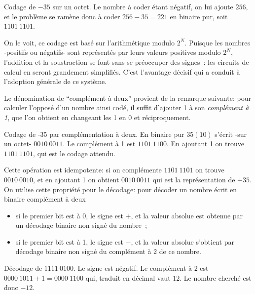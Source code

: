 \begin{exemple}{Codage de $-35$ sur un octet.} Le nombre \`a coder \'etant n\'egatif,
on lui ajoute $256$, et le probl\`eme se ram\`ene donc \`a coder 
$256-35 = 221$ en binaire pur, soit $1101\ 1101$.
\end{exemple}

On le voit, ce codage est bas\'e sur l'arithm\'etique modulo $2^N$. Puisque
les nombres -positifs ou n\'egatifs- sont repr\'esent\'es par leurs 
valeurs positives modulo $2^N$,
l'addition et la soustraction se font sans se pr\'eoccuper des signes~:
les circuits de calcul en seront grandement simplifi\'es.
C'est l'avantage d\'ecisif qui a conduit \`a l'adoption 
générale de ce syst\`eme.

Le d\'enomination de ``compl\'ement \`a deux'' provient 
de la remarque suivante:
pour calculer l'oppos\'e d'un nombre ainsi cod\'e, il suffit d'ajouter 1 \`a
son {\em compl\'ement \`a 1}, que l'on obtient en changeant les 1 en 0 et 
r\'eciproquement.

\begin{exemple}{Codage de -35 par compl\'ementation \`a deux.}
En binaire pur $35 (10)$ s'\'ecrit -sur un octet- $0010\ 0011$. 
Le compl\'ement \`a 1 est $1101\ 1100$.  En ajoutant 1 on trouve
$1101\ 1101$, qui est le codage attendu.
\end{exemple}

\begin{remarque}{}
Cette op\'eration est idempotente: si on compl\'emente
$1101\ 1101$ on trouve $0010\ 0010$, et en ajoutant 1 on obtient $0010\ 0011$
qui est la repr\'esentation de $+35$.  On utilise cette propri\'et\'e pour le
d\'ecodage: pour d\'ecoder un nombre \'ecrit en binaire compl\'ement \`a deux
\begin{itemize}
\item si le premier bit est \`a 0, le signe est $+$, et la valeur absolue est obtenue
par un d\'ecodage binaire non sign\'e du nombre~;
\item si le premier bit est \`a 1, le signe est $-$, et la valeur absolue
s'obtient par d\'ecodage binaire non sign\'e du compl\'ement \`a 2 de 
ce nombre.
\end{itemize}
\end{remarque}

\begin{exemple}{D\'ecodage de $1111\ 0100$.} Le signe est n\'egatif. Le
compl\'ement \`a 2 est $0000\ 1011 + 1 = 0000\  1100$ qui, traduit en d\'ecimal vaut $12$.
Le nombre cherch\'e est donc $-12$.
\end{exemple}

